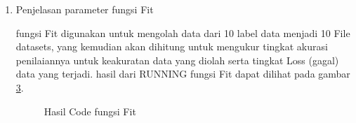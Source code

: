 \begin{enumerate}
\subitem fungsi Compile digunakan untuk melakukan proses yang akan mengecek data parameter yang akan digunakan dari data yang telah diolah dari proses Sequential. hasil dari RUNNING pada fungsi Compile dapat dilihat pada gambar \ref{data16}

\begin{figure}[!htbp]
      \caption{Hasil Code fungsi Compile}
      \label{data16}
\end{figure}

\subitem pada gambar \ref{data17} adalah hasil dari penjelasan tentang data Sequential dan Compile

\begin{figure}[!htbp]
      \caption{Hasil Code Program Summary}
      \label{data17}
\end{figure}

\item Penjelasan parameter fungsi Fit



\subitem fungsi Fit digunakan untuk mengolah data dari 10 label data menjadi 10 File datasets, yang kemudian akan dihitung untuk mengukur tingkat akurasi penilaiannya untuk keakuratan data yang diolah serta tingkat Loss (gagal) data yang terjadi. hasil dari RUNNING fungsi Fit dapat dilihat pada gambar \ref{data18}.

\begin{figure}[!htbp]
      \caption{Hasil Code fungsi Fit}
      \label{data18}
\end{figure}


\end{enumerate}
